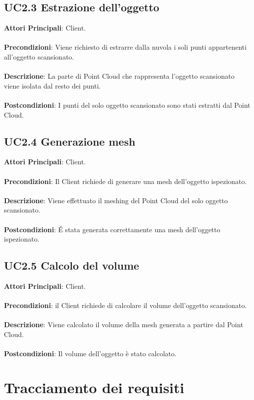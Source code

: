 \subsection{UC2.3 Estrazione dell'oggetto}
\textbf{Attori Principali}: Client.
\\\\ \textbf{Precondizioni}: Viene richiesto di estrarre dalla nuvola i soli punti appartenenti all'oggetto scansionato.
\\\\ \textbf{Descrizione}: La parte di Point Cloud che rappresenta l'oggetto scansionato viene isolata dal resto dei punti.
\\\\ \textbf{Postcondizioni}: I punti del solo oggetto scansionato sono stati estratti dal Point Cloud.

\subsection{UC2.4 Generazione mesh}
\textbf{Attori Principali}: Client.
\\\\ \textbf{Precondizioni}: Il Client richiede di generare una mesh dell'oggetto ispezionato.
\\\\ \textbf{Descrizione}: Viene effettuato il meshing del Point Cloud del solo oggetto scansionato.
\\\\ \textbf{Postcondizioni}: \'E stata generata correttamente una mesh dell'oggetto ispezionato.

\subsection{UC2.5 Calcolo del volume}
\textbf{Attori Principali}: Client.
\\\\ \textbf{Precondizioni}: il Client richiede di calcolare il volume dell'oggetto scansionato.
\\\\ \textbf{Descrizione}: Viene calcolato il volume della mesh generata a partire dal Point Cloud.
\\\\ \textbf{Postcondizioni}: Il volume dell'oggetto è stato calcolato.





\section{Tracciamento dei requisiti}

